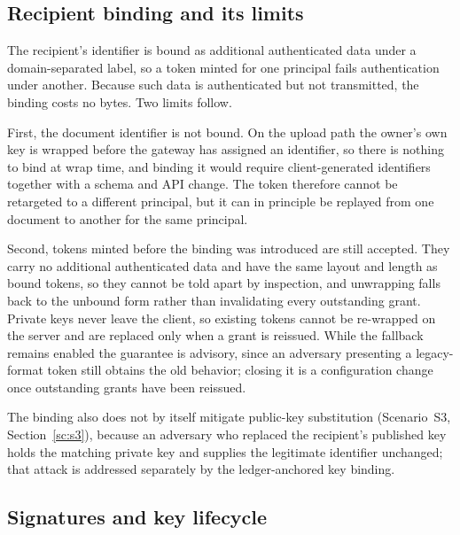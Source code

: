 \documentclass[preprint,12pt]{elsarticle}
\begin{document}
\subsection{Recipient binding and its limits}
\label{sec:tokenformat}

The recipient's identifier is bound as additional authenticated data under a
domain-separated label, so a token minted for one principal fails
authentication under another. Because such data is authenticated but not
transmitted, the binding costs no bytes. Two limits follow.

First, the document identifier is not bound. On the upload path the owner's
own key is wrapped before the gateway has assigned an identifier, so there is
nothing to bind at wrap time, and binding it would require client-generated
identifiers together with a schema and API change. The token therefore cannot
be retargeted to a different principal, but it can in principle be replayed
from one document to another for the same principal.

Second, tokens minted before the binding was introduced are still accepted.
They carry no additional authenticated data and have the same layout and
length as bound tokens, so they cannot be told apart by inspection, and
unwrapping falls back to the unbound form rather than invalidating
every outstanding grant. Private keys never leave the client, so existing
tokens cannot be re-wrapped on the server and are replaced only when a grant is
reissued. While the fallback remains enabled the guarantee is advisory, since
an adversary presenting a legacy-format token still obtains the old behavior;
closing it is a configuration change once outstanding grants have been
reissued.

The binding also does not by itself mitigate public-key substitution
(Scenario~S3, Section~\ref{sc:s3}), because an adversary who replaced the
recipient's published key holds the matching private key and supplies the
legitimate identifier unchanged; that attack is addressed separately by the
ledger-anchored key binding.

\subsection{Signatures and key lifecycle}
\label{sec:signatures}
\end{document}
